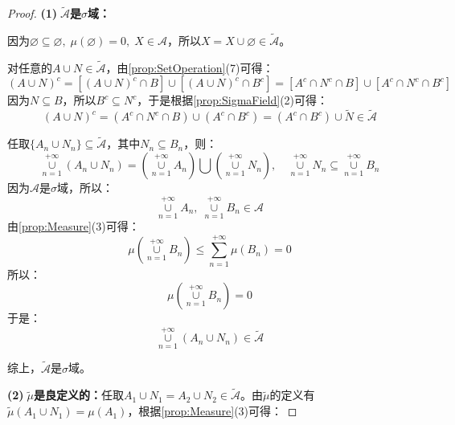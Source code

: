 \begin{proof}
	\textbf{(1)$\;\tilde{\mathscr{A}}$是$\sigma$域：}\par
	因为$\varnothing\subseteq\varnothing,\;\mu(\varnothing)=0,\;X\in\mathscr{A}$，所以$X=X\cup\varnothing\in\tilde{\mathscr{A}}$。\par
	对任意的$A\cup N\in\tilde{\mathscr{A}}$，由\cref{prop:SetOperation}(7)可得：
	\begin{equation*}
		(A\cup N)^c=[(A\cup N)^c\cap B]\cup[(A\cup N)^c\cap B^c]=[A^c\cap N^c\cap B]\cup[A^c\cap N^c\cap B^c]
	\end{equation*}
	因为$N\subseteq B$，所以$B^c\subseteq N^c$，于是根据\cref{prop:SigmaField}(2)可得：
	\begin{equation*}
		(A\cup N)^c=(A^c\cap N^c\cap B)\cup(A^c\cap B^c)=(A^c\cap B^c)\cup\tilde{N}\in\tilde{\mathscr{A}}
	\end{equation*}\par
	任取$\{A_n\cup N_n\}\subseteq\tilde{\mathscr{A}}$，其中$N_n\subseteq B_n$，则：
	\begin{equation*}
		\underset{n=1}{\overset{+\infty}{\cup}}(A_n\cup N_n)=\left(\underset{n=1}{\overset{+\infty}{\cup}}A_n\right)\bigcup\left(\underset{n=1}{\overset{+\infty}{\cup}}N_n\right),\quad\underset{n=1}{\overset{+\infty}{\cup}}N_n\subseteq\underset{n=1}{\overset{+\infty}{\cup}}B_n
	\end{equation*}
	因为$\mathscr{A}$是$\sigma$域，所以：
	\begin{equation*}
		\underset{n=1}{\overset{+\infty}{\cup}}A_n,\;\underset{n=1}{\overset{+\infty}{\cup}}B_n\in\mathscr{A}
	\end{equation*}
	由\cref{prop:Measure}(3)可得：
	\begin{equation*}
		\mu\left(\underset{n=1}{\overset{+\infty}{\cup}}B_n\right)\leqslant\sum_{n=1}^{+\infty}\mu(B_n)=0
	\end{equation*}
	所以：
	\begin{equation*}
		\mu\left(\underset{n=1}{\overset{+\infty}{\cup}}B_n\right)=0
	\end{equation*}
	于是：
	\begin{equation*}
		\underset{n=1}{\overset{+\infty}{\cup}}(A_n\cup N_n)\in\tilde{\mathscr{A}}
	\end{equation*}\par
	综上，$\tilde{\mathscr{A}}$是$\sigma$域。\par
	\textbf{(2)$\;\tilde{\mu}$是良定义的：}任取$A_1\cup N_1=A_2\cup N_2\in\tilde{\mathscr{A}}$。由$\tilde{\mu}$的定义有$\tilde{\mu}(A_1\cup N_1)=\mu(A_1)$，根据\cref{prop:Measure}(3)可得：

\end{proof}
